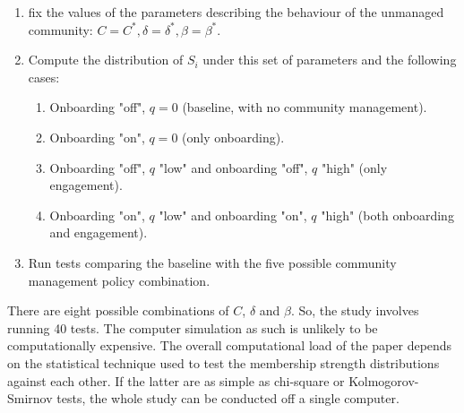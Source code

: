 \documentclass{article}
\begin{document}
\begin{enumerate}
	\item fix the values of the parameters describing the behaviour of the unmanaged community: $C = C^*, \delta = \delta^*, \beta = \beta^*$. 
	\item Compute the distribution of $S_i$ under this set of parameters and the following cases: 
	\begin{enumerate}[label*=\arabic*.]
		\item Onboarding "off", $q = 0$ (baseline, with no community management).
		\item Onboarding "on", $q = 0$ (only onboarding). 
		\item Onboarding "off", $q$ "low" and onboarding "off", $q$ "high" (only engagement).
		\item Onboarding "on", $q$ "low" and onboarding "on", $q$ "high" (both onboarding and engagement).
	\end{enumerate}
	\item Run tests comparing the baseline with the five possible community management policy combination.  
\end{enumerate}

There are eight possible combinations of $C$, $\delta$ and $\beta$. So, the study involves running 40 tests. The computer simulation as such is unlikely to be computationally expensive. The overall computational load of the paper depends on the statistical technique used to test the membership strength distributions against each other. If the latter are as simple as chi-square or Kolmogorov-Smirnov tests, the whole study can be conducted off a single computer.

	
	
	
\end{document}
